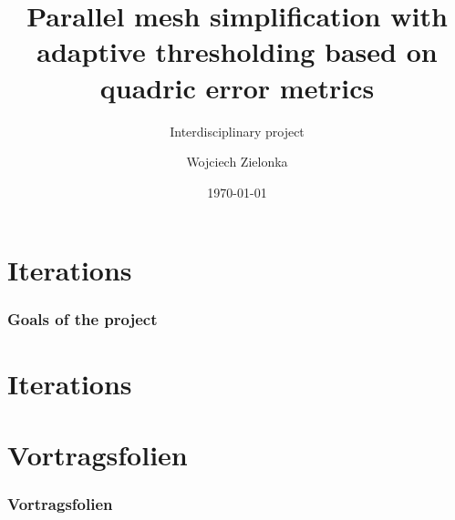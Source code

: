 \documentclass[
	10pt,
	t		%
]{beamer}
\title{Parallel mesh simplification with adaptive thresholding based on quadric error metrics}
\subtitle{Interdisciplinary project}
\author{Wojciech Zielonka}
\date{\today}
\begin{document}
\AddToShipoutPicture{\TitlePicture}
\maketitle
\ClearShipoutPicture
\AddToShipoutPicture{\BackgroundPicture}

\section{Iterations}
\begin{frame}
\frametitle{Goals of the project}
\end{frame}

\section{Iterations}
\begin{frame}
\begin{center}
\end{center}
\end{frame}

\section{Vortragsfolien}
\begin{frame}
\frametitle{Vortragsfolien}
\end{frame}
\end{document}
